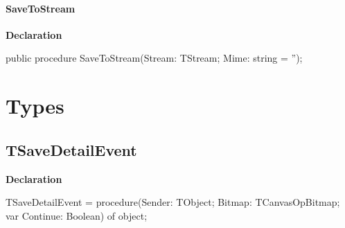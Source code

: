 \documentclass{report}
\newif\ifpdf
\begin{document}
\paragraph*{SaveToStream}\hspace*{\fill}

\label{opbitmapformats.TOPPicture-SaveToStream}
\begin{list}{}{
\setlength{\itemindent}{0cm}
\setlength{\listparindent}{0cm}
\setlength{\leftmargin}{\evensidemargin}
\addtolength{\leftmargin}{\tmplength}
\settowidth{\labelsep}{X}
\addtolength{\leftmargin}{\labelsep}
\setlength{\labelwidth}{\tmplength}
}
\item[\textbf{Declaration}\hfill]
\ifpdf
\begin{flushleft}
\fi
\begin{ttfamily}
public procedure SaveToStream(Stream: TStream; Mime: string = '');\end{ttfamily}

\ifpdf
\end{flushleft}
\fi

\end{list}
\section{Types}
\ifpdf
\subsection*{\large{\textbf{TSaveDetailEvent}}\normalsize\hspace{1ex}\hrulefill}
\else
\subsection*{TSaveDetailEvent}
\fi
\label{opbitmapformats-TSaveDetailEvent}
\begin{list}{}{
\setlength{\itemindent}{0cm}
\setlength{\listparindent}{0cm}
\setlength{\leftmargin}{\evensidemargin}
\addtolength{\leftmargin}{\tmplength}
\settowidth{\labelsep}{X}
\addtolength{\leftmargin}{\labelsep}
\setlength{\labelwidth}{\tmplength}
}
\item[\textbf{Declaration}\hfill]
\ifpdf
\begin{flushleft}
\fi
\begin{ttfamily}
TSaveDetailEvent = procedure(Sender: TObject; Bitmap: TCanvasOpBitmap; var Continue: Boolean) of object;\end{ttfamily}

\ifpdf
\end{flushleft}
\fi

\end{list}
\ifpdf
\end{document}
